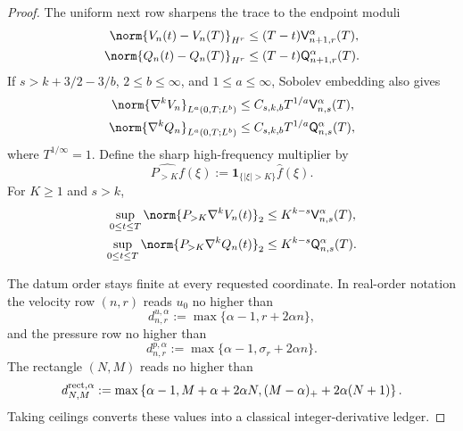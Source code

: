 \begin{proof}
The uniform next row sharpens the trace to the endpoint moduli
\begin{align}
 \norm{V_n(t)-V_n(T)}_{H^r}
 &\le(T-t)\mathsf V_{n+1,r}^\alpha(T),
 \label{eq:hyper-endpoint-modulus}\\
 \norm{Q_n(t)-Q_n(T)}_{H^r}
 &\le(T-t)\mathsf Q_{n+1,r}^\alpha(T).
 \label{eq:hyper-pressure-endpoint-modulus}
\end{align}
If \(s>k+3/2-3/b\), \(2\le b\le\infty\), and
\(1\le a\le\infty\), Sobolev embedding also gives
\begin{align}
 \norm{\nabla^kV_n}_{L^a(0,T;L^b)}
 &\le C_{s,k,b}T^{1/a}\mathsf V_{n,s}^\alpha(T),
 \label{eq:hyper-mixed-norm}\\
 \norm{\nabla^kQ_n}_{L^a(0,T;L^b)}
 &\le C_{s,k,b}T^{1/a}\mathsf Q_{n,s}^\alpha(T),
 \label{eq:hyper-pressure-mixed-norm}
\end{align}
where \(T^{1/\infty}=1\).  Define the sharp high-frequency multiplier by
\begin{equation}
 \widehat{P_{>K}f}(\xi)
 :=\mathbf1_{\{|\xi|>K\}}\widehat f(\xi).
 \label{eq:hyper-tail-projector}
\end{equation}
For \(K\ge1\) and \(s>k\),
\begin{align}
 \sup_{0\le t\le T}
 \norm{P_{>K}\nabla^kV_n(t)}_2
 &\le K^{k-s}\mathsf V_{n,s}^\alpha(T),
 \label{eq:hyper-frequency-tail}\\
 \sup_{0\le t\le T}
 \norm{P_{>K}\nabla^kQ_n(t)}_2
 &\le K^{k-s}\mathsf Q_{n,s}^\alpha(T).
 \label{eq:hyper-pressure-frequency-tail}
\end{align}

The datum order stays finite at every requested coordinate.  In real-order
notation the velocity row \((n,r)\) reads \(u_0\) no higher than
\begin{equation}
 d_{n,r}^{u,\alpha}
 :=\max\{\alpha-1,r+2\alpha n\},
 \label{eq:hyper-velocity-ledger}
\end{equation}
and the pressure row no higher than
\begin{equation}
 d_{n,r}^{p,\alpha}
 :=\max\{\alpha-1,\sigma_r+2\alpha n\}.
 \label{eq:hyper-pressure-ledger}
\end{equation}
The rectangle \((N,M)\) reads no higher than
\begin{equation}
 d_{N,M}^{\rm rect,\alpha}
 :=\max\left\{
  \alpha-1,
  M+\alpha+2\alpha N,
  (M-\alpha)_++2\alpha(N+1)
 \right\}.
 \label{eq:hyper-rectangle-ledger}
\end{equation}
Taking ceilings converts these values into a classical integer-derivative
ledger.


\end{proof}
